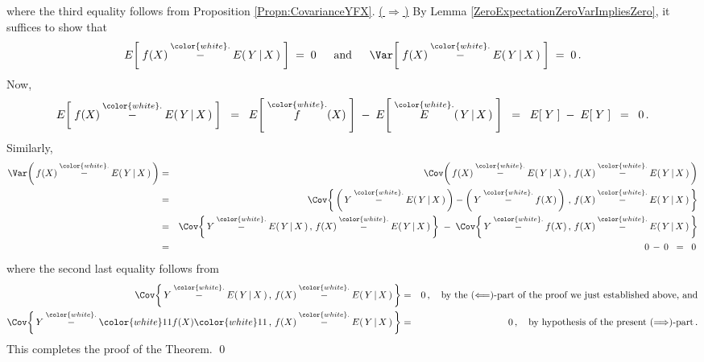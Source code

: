 where the third equality follows from Proposition \ref{Propn:CovarianceYFX}.
\vskip 0.3cm
\noindent
\underline{(\,$\Longrightarrow$\,)}\quad
By Lemma \ref{ZeroExpectationZeroVarImpliesZero}, it suffices to show that
\begin{equation*}
E\!\left[\;f(X) \overset{{\color{white}.}}{-} E(\,Y\,\vert\,X\,)\;\right] \;=\; 0
\quad\;\;\textnormal{and}\quad\;\;
\Var\!\left[\;f(X) \overset{{\color{white}.}}{-} E(\,Y\,\vert\,X\,)\;\right] \;=\; 0\,.
\end{equation*}
Now,
\begin{equation*}
E\!\left[\;f(X) \overset{{\color{white}.}}{-} E(\,Y\,\vert\,X\,)\;\right]
\;\;=\;\;
	E\!\left[\;\overset{{\color{white}.}}{f}(X)\;\right]
	\;-\;
	E\!\left[\;\overset{{\color{white}.}}{E}(\,Y\,\vert\,X\,)\;\right]
\;\;=\;\;
	E\!\left[\;Y\;\right]
	\;-\;
	E\!\left[\;Y\;\right]
\;\;=\;\;
	0\,.
\end{equation*}
Similarly,
\begin{eqnarray*}
\Var\!\left(\,f(X) \overset{{\color{white}.}}{-} E(\,Y\,\vert\,X\,)\,\right)
&=&
	\Cov\!\left(\,f(X) \overset{{\color{white}.}}{-} E(\,Y\,\vert\,X\,)\,,\,f(X) \overset{{\color{white}.}}{-} E(\,Y\,\vert\,X\,)\,\right)
\\
&=&
	\Cov\!\left\{\,
		\left(\,Y \overset{{\color{white}.}}{-} E(\,Y\,\vert\,X\,)\,\right) - \left(\,Y \overset{{\color{white}.}}{-} f(X)\,\right)
		\,,\,
		f(X) \overset{{\color{white}.}}{-} E(\,Y\,\vert\,X\,)
		\,\right\}
\\
&=&
	\Cov\!\left\{\,
		Y \overset{{\color{white}.}}{-} E(\,Y\,\vert\,X\,)
		\,,\,
		f(X) \overset{{\color{white}.}}{-} E(\,Y\,\vert\,X\,)
		\,\right\}
	\;-\;
	\Cov\!\left\{\,
		Y \overset{{\color{white}.}}{-} f(X)
		\,,\,
		f(X) \overset{{\color{white}.}}{-} E(\,Y\,\vert\,X\,)
		\,\right\}
\\
&=&
	0 \,-\, 0
	\;\; = \;\;
	0\,
\end{eqnarray*}
where the second last equality follows from
\begin{eqnarray*}
\Cov\!\left\{\,
	Y \overset{{\color{white}.}}{-} E(\,Y\,\vert\,X\,)
	\,,\,
	f(X) \overset{{\color{white}.}}{-} E(\,Y\,\vert\,X\,)
	\,\right\}
&=& 0\,,
\quad\textnormal{by the $(\Longleftarrow)$-part of the proof we just established above, and}
\\
\Cov\!\left\{\,
	Y \overset{{\color{white}.}}{-} {\color{white}11} f(X) {\color{white}11}
	\,,\,
	f(X) \overset{{\color{white}.}}{-} E(\,Y\,\vert\,X\,)
	\,\right\}
&=& 0\,,
\quad\textnormal{by hypothesis of the present $(\Longrightarrow)$-part}\,.
\end{eqnarray*}
This completes the proof of the Theorem.
\qed

